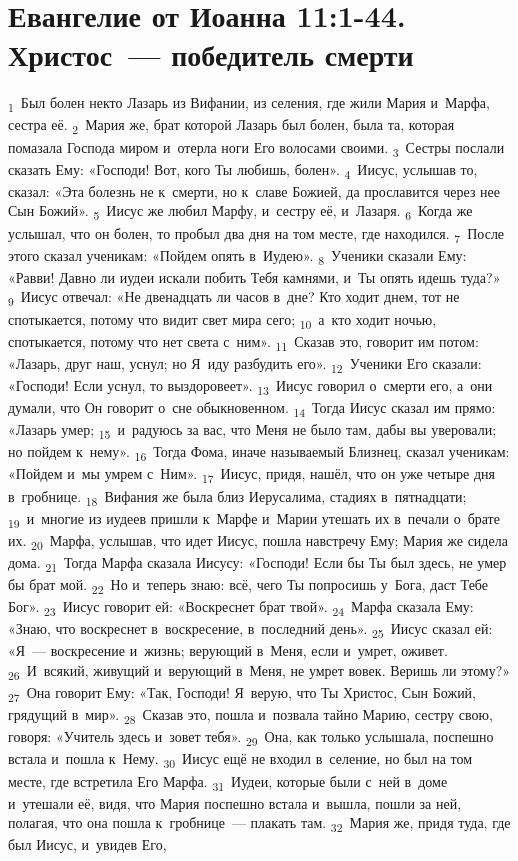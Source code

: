 \documentclass[a4paper,12pt]{article}
\begin{document}
\section{Евангелие от Иоанна 11:1-44. Христос~--- победитель смерти}

 \textsubscript{1}~Был болен некто Лазарь из Вифании, из селения, где жили Мария и~Марфа, сестра её. \textsubscript{2}~Мария же, брат которой Лазарь был болен, была та, которая помазала Господа миром и~отерла ноги Его волосами своими. \textsubscript{3}~Сестры послали сказать Ему: «Господи! Вот, кого Ты любишь, болен». \textsubscript{4}~Иисус, услышав то, сказал: «Эта болезнь не к~смерти, но к~славе Божией, да прославится через нее Сын Божий». \textsubscript{5}~Иисус же любил Марфу, и~сестру её, и~Лазаря. \textsubscript{6}~Когда же услышал, что он болен, то пробыл два дня на том месте, где находился. \textsubscript{7}~После этого сказал ученикам: «Пойдем опять в~Иудею». \textsubscript{8}~Ученики сказали Ему: «Равви! Давно ли иудеи искали побить Тебя камнями, и~Ты опять идешь туда?» \textsubscript{9}~Иисус отвечал: «Не двенадцать ли часов в~дне? Кто ходит днем, тот не спотыкается, потому что видит свет мира сего; \textsubscript{10}~а~кто ходит ночью, спотыкается, потому что нет света с~ним». \textsubscript{11}~Сказав это, говорит им потом: «Лазарь, друг наш, уснул; но Я~иду разбудить его». \textsubscript{12}~Ученики Его сказали: «Господи! Если уснул, то выздоровеет». \textsubscript{13}~Иисус говорил о~смерти его, а~они думали, что Он говорит о~сне обыкновенном. \textsubscript{14}~Тогда Иисус сказал им прямо: «Лазарь умер; \textsubscript{15}~и~радуюсь за вас, что Меня не было там, дабы вы уверовали; но пойдем к~нему». \textsubscript{16}~Тогда Фома, иначе называемый Близнец, сказал ученикам: «Пойдем и~мы умрем с~Ним». \textsubscript{17}~Иисус, придя, нашёл, что он уже четыре дня в~гробнице. \textsubscript{18}~Вифания же была близ Иерусалима, стадиях в~пятнадцати; \textsubscript{19}~и~многие из иудеев пришли к~Марфе и~Марии утешать их в~печали о~брате их. \textsubscript{20}~Марфа, услышав, что идет Иисус, пошла навстречу Ему; Мария же сидела дома. \textsubscript{21}~Тогда Марфа сказала Иисусу: «Господи! Если бы Ты был здесь, не умер бы брат мой. \textsubscript{22}~Но и~теперь знаю: всё, чего Ты попросишь у~Бога, даст Тебе Бог». \textsubscript{23}~Иисус говорит ей: «Воскреснет брат твой». \textsubscript{24}~Марфа сказала Ему: «Знаю, что воскреснет в~воскресение, в~последний день». \textsubscript{25}~Иисус сказал ей: «Я~--- воскресение и~жизнь; верующий в~Меня, если и~умрет, оживет. \textsubscript{26}~И~всякий, живущий и~верующий в~Меня, не умрет вовек. Веришь ли этому?» \textsubscript{27}~Она говорит Ему: «Так, Господи! Я~верую, что Ты Христос, Сын Божий, грядущий в~мир». \textsubscript{28}~Сказав это, пошла и~позвала тайно Марию, сестру свою, говоря: «Учитель здесь и~зовет тебя». \textsubscript{29}~Она, как только услышала, поспешно встала и~пошла к~Нему. \textsubscript{30}~Иисус ещё не входил в~селение, но был на том месте, где встретила Его Марфа. \textsubscript{31}~Иудеи, которые были с~ней в~доме и~утешали её, видя, что Мария поспешно встала и~вышла, пошли за ней, полагая, что она пошла к~гробнице~--- плакать там. \textsubscript{32}~Мария же, придя туда, где был Иисус, и~увидев Его, 
\end{document}

